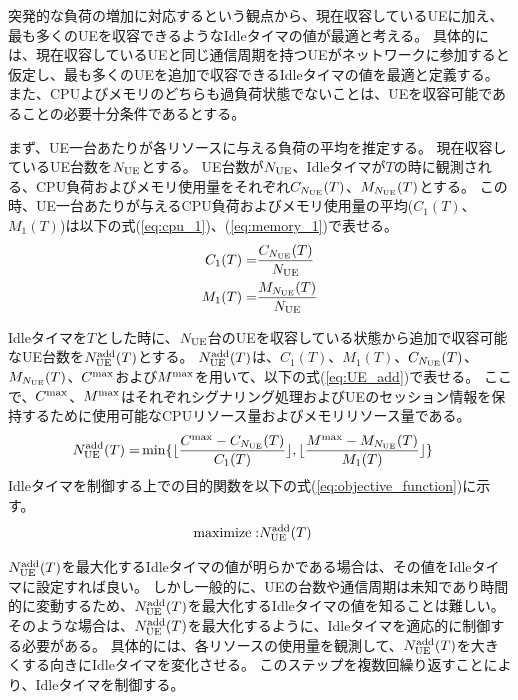 \documentclass[a4j]{ujarticle}
\begin{document}
突発的な負荷の増加に対応するという観点から、現在収容しているUEに加え、最も多くのUEを収容できるようなIdleタイマの値が最適と考える。
具体的には、現在収容しているUEと同じ通信周期を持つUEがネットワークに参加すると仮定し、最も多くのUEを追加で収容できるIdleタイマの値を最適と定義する。
また、CPUよびメモリのどちらも過負荷状態でないことは、UEを収容可能であることの必要十分条件であるとする。

まず、UE一台あたりが各リソースに与える負荷の平均を推定する。
現在収容しているUE台数を$N_{\rm UE}$とする。
UE台数が$N_{\rm UE}$、Idleタイマが$T$の時に観測される、CPU負荷およびメモリ使用量をそれぞれ$C_{N_{\rm UE}}(T)$、$M_{N_{\rm UE}}(T)$とする。
この時、UE一台あたりが与えるCPU負荷およびメモリ使用量の平均($C_{1}(T)$、$M_{1}(T)$)は以下の式(\ref{eq:cpu_1})、(\ref{eq:memory_1})で表せる。
\begin{eqnarray}
   C_{1}(T) =& \frac{C_{N_{\rm UE}}(T)}{N_{\rm UE}}\label{eq:cpu_1}\\
   M_{1}(T) =& \frac{M_{N_{\rm UE}}(T)}{N_{\rm UE}}\label{eq:memory_1}
\end{eqnarray}

Idleタイマを$T$とした時に、$N_{\rm UE}$台のUEを収容している状態から追加で収容可能なUE台数を$N_{\rm UE}^{\rm add}(T)$とする。
$N_{\rm UE}^{\rm add}(T)$は、$C_{1}(T)$、$M_{1}(T)$、$C_{N_{\rm UE}}(T)$、$M_{N_{\rm UE}}(T)$、$C^{\rm max}$および$M^{\rm max}$を用いて、以下の式(\ref{eq:UE_add})で表せる。
ここで、$C^{\rm max}$、$M^{\rm max}$はそれぞれシグナリング処理およびUEのセッション情報を保持するために使用可能なCPUリソース量およびメモリリソース量である。
\begin{eqnarray}
   N_{\rm UE}^{\rm add}(T) =& \min \{\lfloor \frac{C^{\rm max} - C_{N_{\rm UE}}(T)}{C_{1}(T)} \rfloor, \lfloor \frac{M^{\rm max} - M_{N_{\rm UE}}(T)}{M_{1}(T)} \rfloor\} \label{eq:UE_add}
\end{eqnarray}
Idleタイマを制御する上での目的関数を以下の式(\ref{eq:objective_function})に示す。
\begin{eqnarray}
  \text{maximize} :& N_{\rm UE}^{\rm add}(T)
  \label{eq:objective_function}
\end{eqnarray}


$N_{\rm UE}^{\rm add}(T)$を最大化するIdleタイマの値が明らかである場合は、その値をIdleタイマに設定すれば良い。
しかし一般的に、UEの台数や通信周期は未知であり時間的に変動するため、$N_{\rm UE}^{\rm add}(T)$を最大化するIdleタイマの値を知ることは難しい。
そのような場合は、$N_{\rm UE}^{\rm add}(T)$を最大化するように、Idleタイマを適応的に制御する必要がある。
具体的には、各リソースの使用量を観測して、$N_{\rm UE}^{\rm add}(T)$を大きくする向きにIdleタイマを変化させる。
このステップを複数回繰り返すことにより、Idleタイマを制御する。
\end{document}
